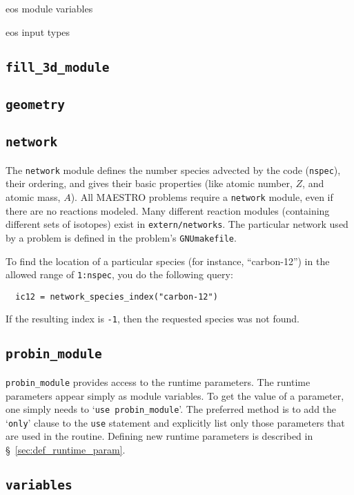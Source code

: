 eos module variables

eos input types


\subsection{{\tt fill\_3d\_module}}

\subsection{{\tt geometry}}

\subsection{{\tt network}}

The {\tt network} module defines the number species advected by the
code ({\tt nspec}), their ordering, and gives their basic properties
(like atomic number, $Z$, and atomic mass, $A$).  All MAESTRO problems
require a {\tt network} module, even if there are no reactions
modeled.  Many different reaction modules (containing different sets
of isotopes) exist in {\tt extern/networks}.  The particular network
used by a problem is defined in the problem's {\tt GNUmakefile}.

To find the location of a particular species (for instance, ``carbon-12'')
in the allowed range of {\tt 1:nspec}, you do the following query:
\begin{verbatim}
  ic12 = network_species_index("carbon-12")
\end{verbatim}
If the resulting index is {\tt -1}, then the requested species was not
found.

\subsection{{\tt probin\_module}}

\label{sec:probin}

{\tt probin\_module} provides access to the runtime parameters.
The runtime parameters appear simply as module variables.  To get the 
value of a parameter, one simply needs to `{\tt use probin\_module}'.
The preferred method is to add the `{\tt only}' clause to the
{\tt use} statement and explicitly list only those parameters that
are used in the routine.  Defining new runtime parameters is
described in \S~\ref{sec:def_runtime_param}.

\subsection{{\tt variables}}

